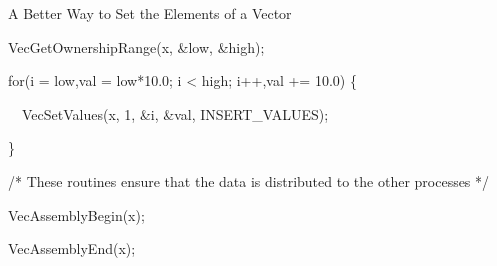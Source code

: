 \begin{frame}{A Better Way to Set the Elements of a Vector}

\begin{semiverbatim}
VecGetOwnershipRange(x, \&low, \&high);

for(i = low,val = low*10.0; i < high; i++,val += 10.0) \{

\ \ VecSetValues(x, 1, \&i, \&val, INSERT\_VALUES);

\}

/* These routines ensure that the data is distributed to the other processes */

VecAssemblyBegin(x);

VecAssemblyEnd(x);
\end{semiverbatim}
\end{frame}
